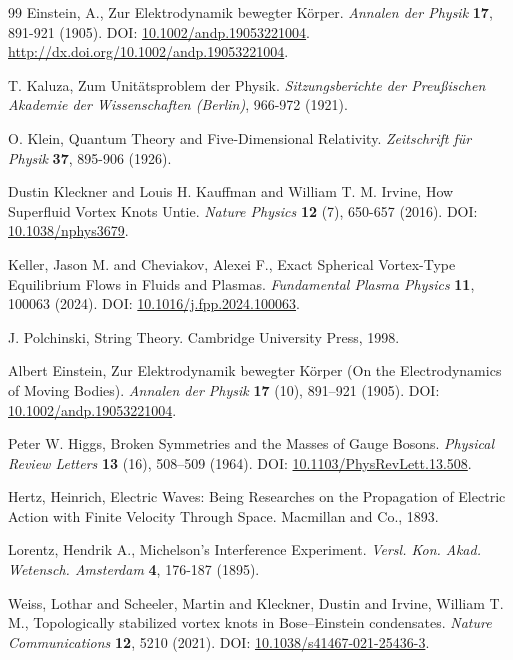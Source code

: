 \documentclass[a4paper,10pt]{article}
\begin{document}
\begin{thebibliography}{99}
Einstein, A.,
\newblock Zur Elektrodynamik bewegter Körper.
\textit{Annalen der Physik} \textbf{17}, 891-921 (1905).
\newblock DOI: \href{https://doi.org/10.1002/andp.19053221004}{10.1002/andp.19053221004}.
\newblock \url{http://dx.doi.org/10.1002/andp.19053221004}.


T. Kaluza,
\newblock Zum Unitätsproblem der Physik.
\textit{Sitzungsberichte der Preußischen Akademie der Wissenschaften (Berlin)}, 966-972 (1921).


O. Klein,
\newblock Quantum Theory and Five-Dimensional Relativity.
\textit{Zeitschrift für Physik} \textbf{37}, 895-906 (1926).


Dustin Kleckner and Louis H. Kauffman and William T. M. Irvine,
\newblock How Superfluid Vortex Knots Untie.
\textit{Nature Physics} \textbf{12} (7), 650-657 (2016).
\newblock DOI: \href{https://doi.org/10.1038/nphys3679}{10.1038/nphys3679}.


Keller, Jason M. and Cheviakov, Alexei F.,
\newblock Exact Spherical Vortex-Type Equilibrium Flows in Fluids and Plasmas.
\textit{Fundamental Plasma Physics} \textbf{11}, 100063 (2024).
\newblock DOI: \href{https://doi.org/10.1016/j.fpp.2024.100063}{10.1016/j.fpp.2024.100063}.


J. Polchinski,
\newblock String Theory.
\newblock Cambridge University Press, 1998.


Albert Einstein,
\newblock Zur Elektrodynamik bewegter Körper (On the Electrodynamics of Moving Bodies).
\textit{Annalen der Physik} \textbf{17} (10), 891--921 (1905).
\newblock DOI: \href{https://doi.org/10.1002/andp.19053221004}{10.1002/andp.19053221004}.


Peter W. Higgs,
\newblock Broken Symmetries and the Masses of Gauge Bosons.
\textit{Physical Review Letters} \textbf{13} (16), 508--509 (1964).
\newblock DOI: \href{https://doi.org/10.1103/PhysRevLett.13.508}{10.1103/PhysRevLett.13.508}.


Hertz, Heinrich,
\newblock Electric Waves: Being Researches on the Propagation of Electric Action with Finite Velocity Through Space.
\newblock Macmillan and Co., 1893.


Lorentz, Hendrik A.,
\newblock Michelson's Interference Experiment.
\textit{Versl. Kon. Akad. Wetensch. Amsterdam} \textbf{4}, 176-187 (1895).


Weiss, Lothar and Scheeler, Martin and Kleckner, Dustin and Irvine, William T. M.,
\newblock Topologically stabilized vortex knots in Bose–Einstein condensates.
\textit{Nature Communications} \textbf{12}, 5210 (2021).
\newblock DOI: \href{https://doi.org/10.1038/s41467-021-25436-3}{10.1038/s41467-021-25436-3}.



\end{thebibliography}
\end{document}
